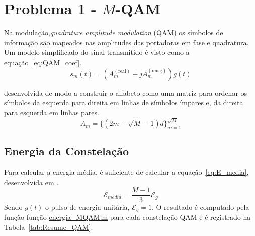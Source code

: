 \section{Problema 1 - \texorpdfstring{$M$}{M}-QAM}

Na modulação,\textit{quadrature amplitude modulation} (QAM) os símbolos de informação são mapeados nas amplitudes das portadoras em fase e quadratura. Um modelo simplificado do sinal transmitido é visto como a equação~\ref{eq:QAM_coef}.
\begin{equation}
    s_m(t) = ( A_m^{(\text{real})} + j A_m^{(\text{imag})}) g(t)
    \label{eq:QAM_coef}
\end{equation}


desenvolvida de modo a construir o alfabeto como uma matriz para ordenar os símbolos da esquerda para direita em linhas de símbolos ímpares e, da direita para esquerda em linhas pares.
\begin{equation}
    A_m = \{(2m -\sqrt{M} - 1)d \}_{m=1}^{\sqrt{M}}
    \label{eq:QAM_retangular}
\end{equation}


\subsection{Energia da Constelação} 
Para calcular a energia média, é suficiente de calcular a equação~\ref{eq:E_media}, desenvolvida em \cite{Cecilio,Proakis}.
\begin{equation}
    \mathcal{E}_{media} = \frac{M-1}{3} \mathcal{E}_g
    \label{eq:E_media}
\end{equation}
Sendo $g(t)$ o pulso de energia unitária, $\mathcal{E}_g = 1$. O resultado é computado pela função função \href{https://raw.githubusercontent.com/lucasabdalah/Courses-HWs/SCD/Sistemas%20de%20Comunicacoes%20Digitais/matlab/problema1/energia_MQAM.m}{energia\_MQAM.m} para cada constelação QAM e é registrado na Tabela~\ref{tab:Resume_QAM}.

